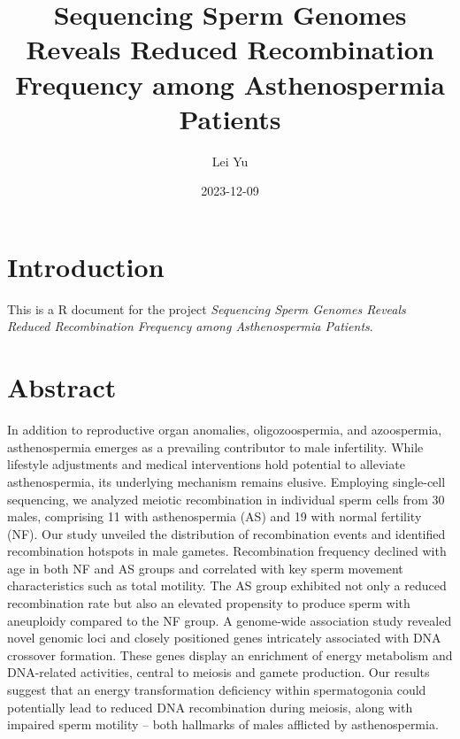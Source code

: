 \documentclass[
  letterpaper,
  DIV=11,
  numbers=noendperiod]{scrreprt}
\title{Sequencing Sperm Genomes Reveals Reduced Recombination Frequency
among Asthenospermia Patients}
\author{Lei Yu}
\date{2023-12-09}
\renewcommand*\contentsname{Table of contents}
\newcommand\contentsname{Table of contents}
\begin{document}
\maketitle
\ifdefined\Shaded\renewenvironment{Shaded}{\begin{tcolorbox}[enhanced, sharp corners, breakable, boxrule=0pt, frame hidden, interior hidden, borderline west={3pt}{0pt}{shadecolor}]}{\end{tcolorbox}}\fi

\renewcommand*\contentsname{Table of contents}
{
\hypersetup{linkcolor=}
\setcounter{tocdepth}{2}
\tableofcontents
}

\hypertarget{introduction}{%
\chapter{Introduction}\label{introduction}}

This is a R document for the project \emph{Sequencing Sperm Genomes
Reveals Reduced Recombination Frequency among Asthenospermia Patients}.


\hypertarget{abstract}{%
\chapter{Abstract}\label{abstract}}

In addition to reproductive organ anomalies, oligozoospermia, and
azoospermia, asthenospermia emerges as a prevailing contributor to male
infertility. While lifestyle adjustments and medical interventions hold
potential to alleviate asthenospermia, its underlying mechanism remains
elusive. Employing single-cell sequencing, we analyzed meiotic
recombination in individual sperm cells from 30 males, comprising 11
with asthenospermia (AS) and 19 with normal fertility (NF). Our study
unveiled the distribution of recombination events and identified
recombination hotspots in male gametes. Recombination frequency declined
with age in both NF and AS groups and correlated with key sperm movement
characteristics such as total motility. The AS group exhibited not only
a reduced recombination rate but also an elevated propensity to produce
sperm with aneuploidy compared to the NF group. A genome-wide
association study revealed novel genomic loci and closely positioned
genes intricately associated with DNA crossover formation. These genes
display an enrichment of energy metabolism and DNA-related activities,
central to meiosis and gamete production. Our results suggest that an
energy transformation deficiency within spermatogonia could potentially
lead to reduced DNA recombination during meiosis, along with impaired
sperm motility -- both hallmarks of males afflicted by asthenospermia.
\end{document}
